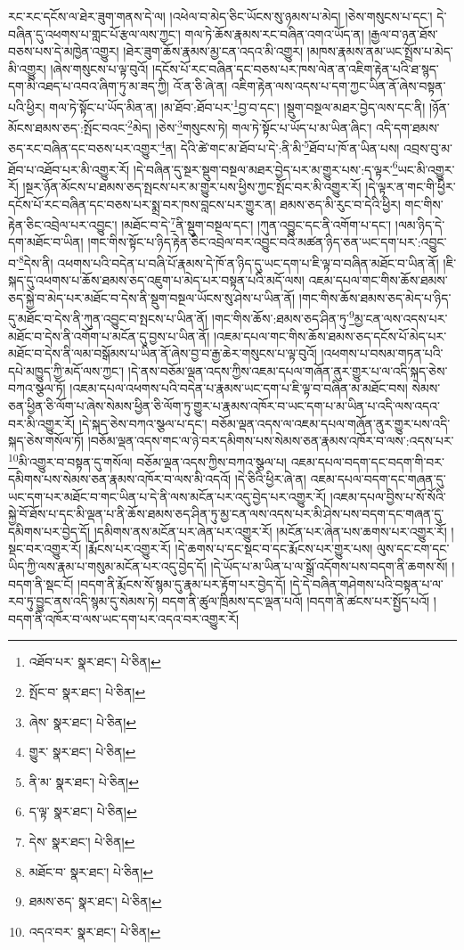རང་རང་དངོས་ལ་ཐེར་ཟུག་གནས་དེ་ལ། །འཕེལ་བ་མེད་ཅིང་ཡོངས་སུ་ཉམས་པ་མེད། །ཅེས་གསུངས་པ་དང་། དེ་བཞིན་དུ་འཕགས་པ་གླང་པོ་རྩལ་ལས་ཀྱང་། གལ་ཏེ་ཆོས་རྣམས་རང་བཞིན་འགའ་ཡོད་ན། །རྒྱལ་བ་ཉན་ཐོས་བཅས་པས་དེ་མཁྱེན་འགྱུར། །ཐེར་ཟུག་ཆོས་རྣམས་མྱ་ངན་འདའ་མི་འགྱུར། །མཁས་རྣམས་ནམ་ཡང་སྤྲོས་པ་མེད་མི་འགྱུར། །ཞེས་གསུངས་པ་ལྟ་བུའོ། །དངོས་པོ་རང་བཞིན་དང་བཅས་པར་ཁས་ལེན་ན་འཇིག་རྟེན་པའི་ཐ་སྙད་དག་མི་འཐད་པ་འབའ་ཞིག་ཏུ་མ་ཟད་ཀྱི། འོ་ན་ཅི་ཞེ་ན། འཇིག་རྟེན་ལས་འདས་པ་དག་ཀྱང་ཡིན་ནོ་ཞེས་བསྟན་པའི་ཕྱིར། གལ་ཏེ་སྟོང་པ་ཡོད་མིན་ན། །མ་ཐོབ་:ཐོབ་པར་\footnote{འཐོབ་པར་  སྣར་ཐང་།  པེ་ཅིན། }བྱ་བ་དང་། །སྡུག་བསྔལ་མཐར་བྱེད་ལས་དང་ནི། །ཉོན་མོངས་ཐམས་ཅད་:སྤོང་བའང་\footnote{སྤོང་བ་  སྣར་ཐང་།  པེ་ཅིན། }མེད། །ཅེས་\footnote{ཞེས་  སྣར་ཐང་།  པེ་ཅིན། }གསུངས་ཏེ། གལ་ཏེ་སྟོང་པ་ཡོད་པ་མ་ཡིན་ཞིང་། འདི་དག་ཐམས་ཅད་རང་བཞིན་དང་བཅས་པར་འགྱུར་\footnote{གྱུར་  སྣར་ཐང་།  པེ་ཅིན། }ན། དེའི་ཚེ་གང་མ་ཐོབ་པ་དེ་:ནི་མི་\footnote{ནི་མ་  སྣར་ཐང་།  པེ་ཅིན། }ཐོབ་པ་ཁོ་ན་ཡིན་པས། འབྲས་བུ་མ་ཐོབ་པ་འཐོབ་པར་མི་འགྱུར་རོ། །དེ་བཞིན་དུ་སྔར་སྡུག་བསྔལ་མཐར་བྱེད་པར་མ་གྱུར་པས་:ད་ལྟར་\footnote{ད་ལྟ་  སྣར་ཐང་།  པེ་ཅིན། }ཡང་མི་འགྱུར་རོ། །སྔར་ཉོན་མོངས་པ་ཐམས་ཅད་སྤངས་པར་མ་གྱུར་པས་ཕྱིས་ཀྱང་སྤོང་བར་མི་འགྱུར་རོ། །དེ་ལྟར་ན་གང་གི་ཕྱིར་དངོས་པོ་རང་བཞིན་དང་བཅས་པར་སྨྲ་བར་ཁས་བླངས་པར་གྱུར་ན། ཐམས་ཅད་མི་རུང་བ་དེའི་ཕྱིར། གང་གིས་རྟེན་ཅིང་འབྲེལ་པར་འབྱུང་། །མཐོང་བ་དེ་\footnote{དེས་  སྣར་ཐང་།  པེ་ཅིན། }ནི་སྡུག་བསྔལ་དང་། །ཀུན་འབྱུང་དང་ནི་འགོག་པ་དང་། །ལམ་ཉིད་དེ་དག་མཐོང་བ་ཡིན། །གང་གིས་སྟོང་པ་ཉིད་རྟེན་ཅིང་འབྲེལ་བར་འབྱུང་བའི་མཚན་ཉིད་ཅན་ཡང་དག་པར་:འབྱུང་བ་\footnote{མཐོང་བ་  སྣར་ཐང་།  པེ་ཅིན། }དེས་ནི། འཕགས་པའི་བདེན་པ་བཞི་པོ་རྣམས་དེ་ཁོ་ན་ཉིད་དུ་ཡང་དག་པ་ཇི་ལྟ་བ་བཞིན་མཐོང་བ་ཡིན་ནོ། །ཇི་སྐད་དུ་འཕགས་པ་ཆོས་ཐམས་ཅད་འཇུག་པ་མེད་པར་བསྟན་པའི་མདོ་ལས། འཇམ་དཔལ་གང་གིས་ཆོས་ཐམས་ཅད་སྐྱེ་བ་མེད་པར་མཐོང་བ་དེས་ནི་སྡུག་བསྔལ་ཡོངས་སུ་ཤེས་པ་ཡིན་ནོ། །གང་གིས་ཆོས་ཐམས་ཅད་མེད་པ་ཉིད་དུ་མཐོང་བ་དེས་ནི་ཀུན་འབྱུང་བ་སྤངས་པ་ཡིན་ནོ། །གང་གིས་ཆོས་:ཐམས་ཅད་ཤིན་ཏུ་\footnote{ཐམས་ཅད་  སྣར་ཐང་།  པེ་ཅིན། }མྱ་ངན་ལས་འདས་པར་མཐོང་བ་དེས་ནི་འགོག་པ་མངོན་དུ་བྱས་པ་ཡིན་ནོ། །འཇམ་དཔལ་གང་གིས་ཆོས་ཐམས་ཅད་དངོས་པོ་མེད་པར་མཐོང་བ་དེས་ནི་ལམ་བསྒོམས་པ་ཡིན་ནོ་ཞེས་བྱ་བ་རྒྱ་ཆེར་གསུངས་པ་ལྟ་བུའོ། །འཕགས་པ་བསམ་གཏན་པའི་དཔེ་མཁྱུད་ཀྱི་མདོ་ལས་ཀྱང་། །དེ་ནས་བཅོམ་ལྡན་འདས་ཀྱིས་འཇམ་དཔལ་གཞོན་ནུར་གྱུར་པ་ལ་འདི་སྐད་ཅེས་བཀའ་སྩལ་ཏོ། །འཇམ་དཔལ་འཕགས་པའི་བདེན་པ་རྣམས་ཡང་དག་པ་ཇི་ལྟ་བ་བཞིན་མ་མཐོང་བས། སེམས་ཅན་ཕྱིན་ཅི་ལོག་པ་ཞེས་སེམས་ཕྱིན་ཅི་ལོག་ཏུ་གྱུར་པ་རྣམས་འཁོར་བ་ཡང་དག་པ་མ་ཡིན་པ་འདི་ལས་འདའ་བར་མི་འགྱུར་རོ། །དེ་སྐད་ཅེས་བཀའ་སྩལ་པ་དང་། བཅོམ་ལྡན་འདས་ལ་འཇམ་དཔལ་གཞོན་ནུར་གྱུར་པས་འདི་སྐད་ཅེས་གསོལ་ཏོ། །བཅོམ་ལྡན་འདས་གང་ལ་ཉེ་བར་དམིགས་པས་སེམས་ཅན་རྣམས་འཁོར་བ་ལས་:འདས་པར་\footnote{འདའ་བར་  སྣར་ཐང་།  པེ་ཅིན། }མི་འགྱུར་བ་བསྟན་དུ་གསོལ། བཅོམ་ལྡན་འདས་ཀྱིས་བཀའ་སྩལ་པ། འཇམ་དཔལ་བདག་དང་བདག་གི་བར་དམིགས་པས་སེམས་ཅན་རྣམས་འཁོར་བ་ལས་མི་འདའོ། །དེ་ཅིའི་ཕྱིར་ཞེ་ན། འཇམ་དཔལ་བདག་དང་གཞན་དུ་ཡང་དག་པར་མཐོང་བ་གང་ཡིན་པ་དེ་ནི་ལས་མངོན་པར་འདུ་བྱེད་པར་འགྱུར་རོ། །འཇམ་དཔལ་བྱིས་པ་སོ་སོའི་སྐྱེ་བོ་ཐོས་པ་དང་མི་ལྡན་པ་ནི་ཆོས་ཐམས་ཅད་ཤིན་ཏུ་མྱ་ངན་ལས་འདས་པར་མི་ཤེས་པས་བདག་དང་གཞན་དུ་དམིགས་པར་བྱེད་དོ། །དམིགས་ནས་མངོན་པར་ཞེན་པར་འགྱུར་རོ། །མངོན་པར་ཞེན་པས་ཆགས་པར་འགྱུར་རོ། །སྡང་བར་འགྱུར་རོ། །རྨོངས་པར་འགྱུར་རོ། །དེ་ཆགས་པ་དང་སྡང་བ་དང་རྨོངས་པར་གྱུར་པས། ལུས་དང་ངག་དང་ཡིད་ཀྱི་ལས་རྣམ་པ་གསུམ་མངོན་པར་འདུ་བྱེད་དོ། །དེ་ཡོད་པ་མ་ཡིན་པ་ལ་སྒྲོ་འདོགས་པས་བདག་ནི་ཆགས་སོ། །བདག་ནི་སྡང་ངོ། །བདག་ནི་རྨོངས་སོ་སྙམ་དུ་རྣམ་པར་རྟོག་པར་བྱེད་དོ། །དེ་དེ་བཞིན་གཤེགས་པའི་བསྟན་པ་ལ་རབ་ཏུ་བྱུང་ནས་འདི་སྙམ་དུ་སེམས་ཏེ། བདག་ནི་ཚུལ་ཁྲིམས་དང་ལྡན་པའོ། །བདག་ནི་ཚངས་པར་སྤྱོད་པའོ། །བདག་ནི་འཁོར་བ་ལས་ཡང་དག་པར་འདའ་བར་འགྱུར་རོ། 